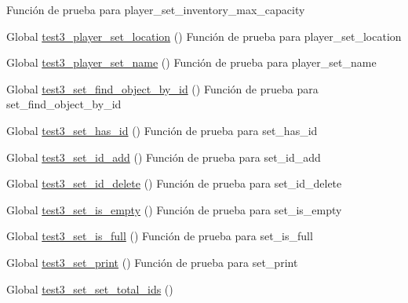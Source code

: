 \begin{DoxyRefList}
%
Función de prueba para player\+\_\+set\+\_\+inventory\+\_\+max\+\_\+capacity  
\item[Global \mbox{\hyperlink{player__test_8c_a317c0c84ef6ef843c15d5bab4a6b8a38}{test3\+\_\+player\+\_\+set\+\_\+location}} ()]\label{test__test000195}%
%
Función de prueba para player\+\_\+set\+\_\+location  
\item[Global \mbox{\hyperlink{player__test_8c_a447ebbb4ba2206abeaf4b60200e312da}{test3\+\_\+player\+\_\+set\+\_\+name}} ()]\label{test__test000179}%
%
Función de prueba para player\+\_\+set\+\_\+name  
\item[Global \mbox{\hyperlink{set__test_8c_adc3b0aec50481d5662dbfbcdf8f114c2}{test3\+\_\+set\+\_\+find\+\_\+object\+\_\+by\+\_\+id}} ()]\label{test__test000230}%
%
Función de prueba para set\+\_\+find\+\_\+object\+\_\+by\+\_\+id  
\item[Global \mbox{\hyperlink{set__test_8c_a64322a83fd39da39e4570fbbc6976c3e}{test3\+\_\+set\+\_\+has\+\_\+id}} ()]\label{test__test000226}%
%
Función de prueba para set\+\_\+has\+\_\+id  
\item[Global \mbox{\hyperlink{set__test_8c_a6042b30d63fe74c02ff1842aa70edfba}{test3\+\_\+set\+\_\+id\+\_\+add}} ()]\label{test__test000213}%
%
Función de prueba para set\+\_\+id\+\_\+add  
\item[Global \mbox{\hyperlink{set__test_8c_a05daf3ec059faeb3b1947c760626bdb1}{test3\+\_\+set\+\_\+id\+\_\+delete}} ()]\label{test__test000217}%
%
Función de prueba para set\+\_\+id\+\_\+delete  
\item[Global \mbox{\hyperlink{set__test_8c_a9041a40207d263088ad80d4429420c81}{test3\+\_\+set\+\_\+is\+\_\+empty}} ()]\label{test__test000234}%
%
Función de prueba para set\+\_\+is\+\_\+empty  
\item[Global \mbox{\hyperlink{set__test_8c_ac9078be0a2f086b649cb04e72065e6e3}{test3\+\_\+set\+\_\+is\+\_\+full}} ()]\label{test__test000237}%
%
Función de prueba para set\+\_\+is\+\_\+full  
\item[Global \mbox{\hyperlink{set__test_8c_a46486651588b6018c403f6736db34973}{test3\+\_\+set\+\_\+print}} ()]\label{test__test000241}%
%
Función de prueba para set\+\_\+print  
\item[Global \mbox{\hyperlink{set__test_8c_adeeea6b893226fca0e9c1ba28dbe098a}{test3\+\_\+set\+\_\+set\+\_\+total\+\_\+ids}} ()]\label{test__test000221}%

\end{DoxyRefList}
